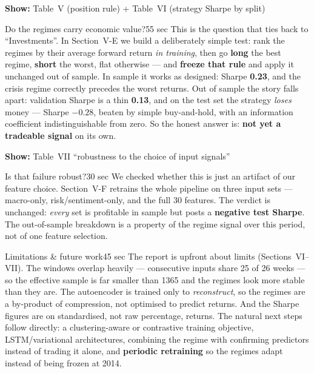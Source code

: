 \documentclass[11pt]{article}
\newcommand{\reportref}[1]{{\small\color{ink}\textbf{Show:} #1}}
\begin{document}
\begin{slide}\reportref{Table~V (position rule) + Table~VI (strategy Sharpe by split)}\end{slide}
\begin{cue}{Do the regimes carry economic value?}{55 sec}
This is the question that ties back to ``Investments''. In Section~V-E we build a
deliberately simple test: rank the regimes by their average forward return
\emph{in training}, then go \textbf{long} the best regime, \textbf{short} the worst,
flat otherwise --- and \textbf{freeze that rule} and apply it unchanged out of
sample. In sample it works as designed: Sharpe \textbf{0.23}, and the crisis regime
correctly precedes the worst returns. Out of sample the story falls apart:
validation Sharpe is a thin \textbf{0.13}, and on the test set the strategy
\emph{loses} money --- Sharpe \textbf{$-0.28$}, beaten by simple buy-and-hold, with
an information coefficient indistinguishable from zero. So the honest answer is:
\textbf{not yet a tradeable signal} on its own.
\end{cue}

\begin{slide}\reportref{Table~VII ``robustness to the choice of input signals''}\end{slide}
\begin{cue}{Is that failure robust?}{30 sec}
We checked whether this is just an artifact of our feature choice. Section~V-F
retrains the whole pipeline on three input sets --- macro-only, risk/sentiment-only,
and the full 30 features. The verdict is unchanged: \emph{every} set is profitable
in sample but posts a \textbf{negative test Sharpe}. The out-of-sample breakdown is
a property of the regime signal over this period, not of one feature selection.
\end{cue}

\begin{cue}{Limitations \& future work}{45 sec}
The report is upfront about limits (Sections~VI–VII). The windows overlap heavily
--- consecutive inputs share 25 of 26 weeks --- so the effective sample is far
smaller than 1365 and the regimes look more stable than they are. The autoencoder is
trained only to \emph{reconstruct}, so the regimes are a by-product of compression,
not optimised to predict returns. And the Sharpe figures are on standardised, not
raw percentage, returns. The natural next steps follow directly: a
clustering-aware or contrastive training objective, LSTM/variational architectures,
combining the regime with confirming predictors instead of trading it alone, and
\textbf{periodic retraining} so the regimes adapt instead of being frozen at 2014.
\end{cue}
\end{document}

